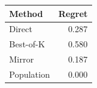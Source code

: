 \begin{tabular}{lr}
\toprule
Method & Regret \\
\midrule
Direct & 0.287 \\
Best-of-K & 0.580 \\
Mirror & 0.187 \\
Population & 0.000 \\
\bottomrule
\end{tabular}
